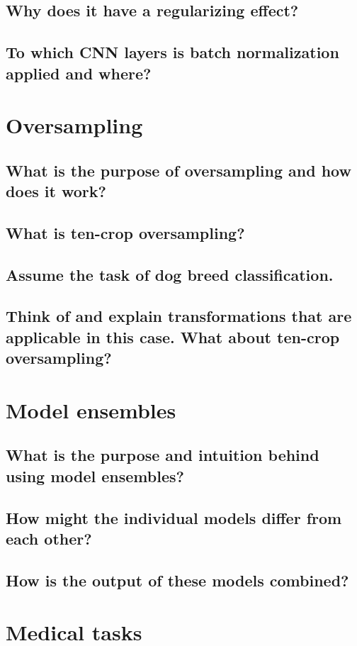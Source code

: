 \subsection{Why does it have a regularizing effect?}
\subsection{To which CNN layers is batch normalization applied and where?}

\section{Oversampling}
\subsection{What is the purpose of oversampling and how does it work?}
\subsection{What is ten-crop oversampling?}
\subsection{Assume the task of dog breed classification.}
\subsection{Think of and explain transformations that are applicable in this case. What about ten-crop oversampling?}

\section{Model ensembles}
\subsection{What is the purpose and intuition behind using model ensembles?}
\subsection{How might the individual models differ from each other?}
\subsection{How is the output of these models combined?}

\section{Medical tasks}
